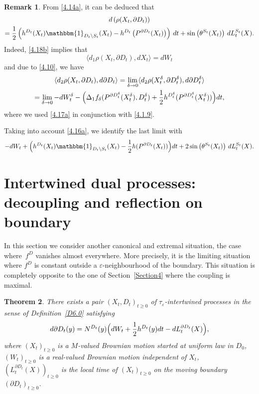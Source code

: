 \documentclass[10pt]{amsart}
\let\backslash\setminus
\theoremstyle{plain}
\newtheorem{thm}{Theorem}[section]
\theoremstyle{definition}
\newtheorem{remark}[thm]{Remark}
\newcommand{\bq}{\begin{equation*}}
\newcommand{\eq}{\end{equation*}}
\newcommand{\un}{\mathbbm{1}}
\let\f\frac
\let\d\delta
\let\e\varepsilon
\let\pa\partial
\begin{document}
\begin{remark}
From \eqref{4.14a}, it can be deduced that
\begin{multline}
d\left(\rho(X_t,\partial D_t)\right)\\
=
\f12\left(h^{D_t}(X_t)\un_{D_t \backslash S_t}(X_t)-h^{D_t}\left(P^{\partial D_t}(X_t)\right)\right)\, dt +\sin\left(\theta^{S_t}(X_t)\right)\,dL_t^{S_t}(X).
\end{multline}
Indeed, \eqref{4.18b} implies that
\bq \langle d_1\rho (X_t,\partial D_t), dX_t\rangle= dW_t\eq
and due to \eqref{4.10}, we have
\begin{multline*}
\langle d_2\rho (X_t,\partial D_t), d\partial D_t\rangle
=\lim_{\d\to0}\langle d_2\rho (X_t^\d,\partial D_t^\d), d\partial D_t^\d\rangle
\\
=\lim_{\d\to0}
-dW^\d_t-\Bigl(\Delta_1f_\d(P^{\pa D_t^\d}(X^\d_t),D_t^\d)+\f12h^{D_t^\d}(P^{\pa D_t^\d}(X^\d_t))\Bigr)dt,
\end{multline*}
where we used
\eqref{4.17a} in conjunction with \eqref{4.1.9}.
\par Taking into account \eqref{4.16a}, we identify the last limit with
\bq
-dW_t+\Bigl(h^{D_t}(X_t)\un_{D_t \backslash S_t}(X_t)-\f12h(P^{\pa D_t}(X_t))\Bigr)dt +2\sin\left(\theta^{S_t}(X_t)\right)\,dL_t^{S_t}(X).
\eq
\end{remark}

\section{Intertwined dual processes: decoupling and reflection on boundary}
\label{Section7}

In this section we consider another canonical and extremal situation, the case where~$f^D$ vanishes almost everywhere. More precisely, it is the limiting situation where $f^D$ is constant outside a $\e$-neighbourhood of the boundary. This situation is completely opposite to the one of Section~\ref{Section4} where the coupling is maximal.


\begin{thm}
\label{T7.1}
There exists a pair $(X_t,D_t)_{t\ge 0}$ of $\tau_\e$-intertwined processes in the sense of Definition~\ref{D6.0} satisfying
\begin{equation}
\label{7.0}
d\partial D_t(y)=N^{D_t}(y)\Bigl( dW_t +\f12 h^{D_t}(y)dt-dL^{\partial D_t}_t(X)\Bigr),
\end{equation}
where $(X_t)_{t\ge0}$ is a $M$-valued Brownian motion started at uniform law in $D_0$, $(W_t)_{t\ge0}$ is a real-valued Brownian motion independent of $X_t$, $(L^{\partial D_t}_t(X))_{t\ge0}$ is the local time of $(X_t)_{t\ge0}$ on the moving boundary $(\partial D_t)_{t\ge0}$.
\end{thm}
\end{document}
